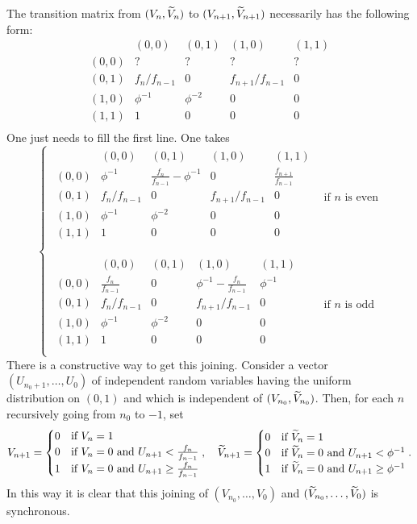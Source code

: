 \documentclass[12pt,a4paper]{article}
\begin{document}
The transition matrix from $(V_n, \widetilde{V}_n)$ to $(V_{n+1}, \widetilde{V}_{n+1})$ 
necessarily has the following form:
$$
\begin{array}{r|cccc}
 & (0,0) & (0,1) & (1,0) & (1,1) \\ 
  \hline
(0,0) & ?  &  ? & ?  & ? \\ 
  (0,1) & f_{n}/f_{n-1} & 0 & f_{n+1}/f_{n-1} & 0 \\ 
  (1,0) & \phi^{-1}  & \phi^{-2}  & 0 & 0 \\ 
  (1,1) & 1 & 0 & 0 & 0 \\ 
\end{array} 
$$
One just needs to fill the first line. One takes 
$$
\begin{cases}
\begin{array}{r|cccc}
 & (0,0) & (0,1) & (1,0) & (1,1) \\ 
  \hline
(0,0) & \phi^{-1}  &  \frac{f_n}{f_{n-1}} - \phi^{-1} & 0  & \frac{f_{n+1}}{f_{n-1}}\\ 
  (0,1) & f_{n}/f_{n-1} & 0 & f_{n+1}/f_{n-1} & 0 \\ 
  (1,0) & \phi^{-1}  & \phi^{-2}  & 0 & 0 \\ 
  (1,1) & 1 & 0 & 0 & 0 \\ 
\end{array} 
& \text{if $n$ is even}
\\ \\
\begin{array}{r|cccc}
 & (0,0) & (0,1) & (1,0) & (1,1) \\ 
  \hline
(0,0) & \frac{f_n}{f_{n-1}} &  0 & \phi^{-1} - \frac{f_n}{f_{n-1}}  & \phi^{-1}\\ 
  (0,1) & f_{n}/f_{n-1} & 0 & f_{n+1}/f_{n-1} & 0 \\ 
  (1,0) & \phi^{-1}  & \phi^{-2}  & 0 & 0 \\ 
  (1,1) & 1 & 0 & 0 & 0 \\ 
\end{array}
& \text{if $n$ is odd}
\end{cases}
$$
There is a constructive way to get this joining. 
Consider a vector $(U_{n_0+1}, \ldots, U_0)$ of independent random variables having the 
uniform distribution on $(0,1)$ and which is independent of $(V_{n_0}, \widetilde{V}_{n_0})$. 
Then, for each $n$ recursively going from $n_0$ to $-1$, set 
$$
V_{n+1} = \begin{cases}
0 & \text{if $V_n=1$} \\
0 & \text{if $V_n=0$ and $U_{n+1} < \frac{f_n}{f_{n-1}}$} \\
1 & \text{if $V_n=0$ and $U_{n+1} \geq \frac{f_n}{f_{n-1}}$}
\end{cases}, \quad 
\widetilde{V}_{n+1} = \begin{cases}
0 & \text{if $\widetilde{V}_n=1$} \\
0 & \text{if $\widetilde{V}_n=0$ and $U_{n+1} < \phi^{-1}$} \\
1 & \text{if $\widetilde{V}_n=0$ and $U_{n+1} \geq \phi^{-1}$}
\end{cases}.
$$
In this way it is clear that this joining of 
$(V_{n_0}, \ldots, V_0)$ and 
$(\widetilde{V}_{n_0}, \ldots, \widetilde{V}_0)$ is synchronous. 
\end{document}
